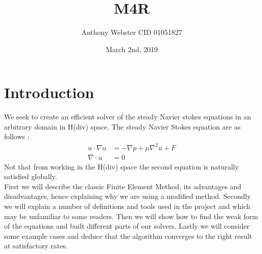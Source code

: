 \documentclass[11pt,twoside,a4paper]{article}
\begin{document}
\setcounter{secnumdepth}{0}
\title{M4R}
\date{March 2nd, 2019}
\author{Anthony Webster CID 01051827}
\maketitle
\section{Introduction}
We seek to create an efficient solver of the steady Navier stokes equations in an arbitrary domain in H(div) space. The steady Navier Stokes equation are as follows : 
\begin{align}
u \cdot \nabla u &= -\nabla p + \mu \nabla^2 u + F \\
\nabla \cdot u &= 0
\end{align}
Not that from working in the H(div) space the second equation is naturally satisfied globally.
\\
First we will describe the classic Finite Element Method, its advantages and disadvantages, hence explaining why we are using a modified method. Secondly we will explain a number of definitions and tools used in the project and which may be unfamiliar to some readers. Then we will show how to find the weak form of the equations and built different parts of our solvers. Lastly we will consider some example cases and deduce that the algorithm converges to the right result at satisfactory rates.\\
\end{document}
